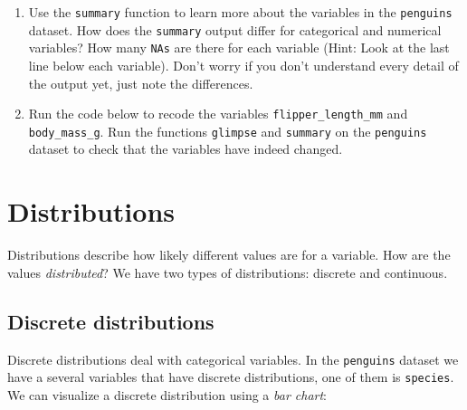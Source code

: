\documentclass[
  letterpaper,
  DIV=11,
  numbers=noendperiod]{scrreprt}
\newenvironment{Shaded}{\begin{snugshade}}{\end{snugshade}}
\newcommand{\FunctionTok}[1]{\textcolor[rgb]{0.28,0.35,0.67}{#1}}
\newcommand{\NormalTok}[1]{\textcolor[rgb]{0.00,0.23,0.31}{#1}}
\newcommand{\OtherTok}[1]{\textcolor[rgb]{0.00,0.23,0.31}{#1}}
\newcommand{\SpecialCharTok}[1]{\textcolor[rgb]{0.37,0.37,0.37}{#1}}
\providecommand{\tightlist}{%
  \setlength{\itemsep}{0pt}\setlength{\parskip}{0pt}}\usepackage{longtable,booktabs,array}
\begin{document}
\begin{enumerate}
\def\labelenumi{\arabic{enumi}.}
\tightlist
\item
  Use the \texttt{summary} function to learn more about the variables in
  the \texttt{penguins} dataset. How does the \texttt{summary} output
  differ for categorical and numerical variables? How many
  \texttt{NA\textquotesingle{}s} are there for each variable (Hint: Look
  at the last line below each variable). Don't worry if you don't
  understand every detail of the output yet, just note the differences.
\item
  Run the code below to recode the variables
  \texttt{flipper\_length\_mm} and \texttt{body\_mass\_g}. Run the
  functions \texttt{glimpse} and \texttt{summary} on the
  \texttt{penguins} dataset to check that the variables have indeed
  changed.
\end{enumerate}

\begin{Shaded}
\end{Shaded}

\section{Distributions}\label{distributions}

Distributions describe how likely different values are for a variable.
How are the values \emph{distributed}? We have two types of
distributions: discrete and continuous.

\subsection{Discrete distributions}\label{sec-basicstat-discdist}

Discrete distributions deal with categorical variables. In the
\texttt{penguins} dataset we have a several variables that have discrete
distributions, one of them is \texttt{species}. We can visualize a
discrete distribution using a \emph{bar chart}:
\end{document}
